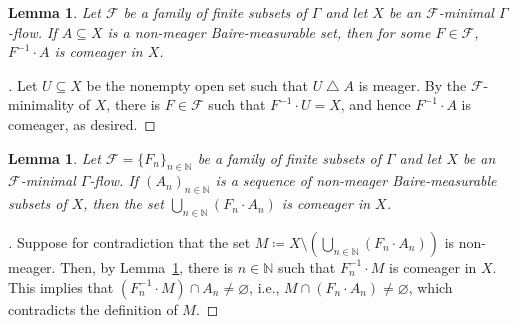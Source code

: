 \documentclass[11pt,reqno,psamsfonts]{amsart}
\theoremstyle{bfnote}
\newtheorem{prop}[theo]{Proposition}
\newtheorem{lemma}[theo]{Lemma}
\theoremstyle{definition}
\theoremstyle{remark}
\newcommand{\0}{\varnothing}
\newcommand{\set}[1]{\{#1\}}
\newcommand{\defeq}{\coloneqq}
\newcommand{\G}{\Gamma}
\newcommand{\Free}{\mathsf{Free}}
\newcommand{\symdif}{\mathbin{\triangle}}
\newcommand{\N}{\mathbb{N}}
\numberwithin{equation}{section}
\newenvironment{scproof}[1][]{\begin{proof}[\textsc{\upshape{Proof}}#1]}{\end{proof}}
\begin{document}
    \begin{lemma}\label{lemma:one_set}
        Let $\mathcal{F}$ be a family of finite subsets of $\G$ and let $X$ be an $\mathcal{F}$-minimal %
        $\G$-flow. If $A \subseteq X$ is a non-meager Baire-measurable set, then for some $F  \in \mathcal{F}$, $F^{-1} \cdot A$ is comeager in $X$.
    \end{lemma}
    \begin{scproof}
        Let $U \subseteq X$ be the nonempty open set such that $U \symdif A$ is meager. By the $\mathcal{F}$-minimality of $X$, there is $F \in \mathcal{F}$ such that $F^{-1} \cdot U = X$, and hence $F^{-1} \cdot A$ is comeager, as desired.
    \end{scproof}

    \begin{lemma}\label{lemma:many_sets}
        Let $\mathcal{F} = \set{F_n}_{n \in \N}$ be a family of finite subsets of $\G$ and let $X$ be an $\mathcal{F}$-minimal %
        $\G$-flow. If $(A_n)_{n \in \N}$ is a sequence of non-meager Baire-measurable subsets of $X$, then the set $\bigcup_{n \in \N} (F_n \cdot A_n)$ is comeager in $X$.
    \end{lemma}
    \begin{scproof}
        Suppose for contradiction that the set $M \defeq X \setminus \left(\bigcup_{n \in \N} (F_n \cdot A_n)\right)$ is non-meager. Then, by Lemma~\ref{lemma:one_set}, there is $n \in \N$ such that $F_n^{-1} \cdot M$ is comeager in $X$. This implies that $(F_n^{-1} \cdot M) \cap A_n \neq \0$, i.e., $M \cap (F_n \cdot A_n) \neq \0$, which contradicts the definition of $M$. 
    \end{scproof}


\end{document}
